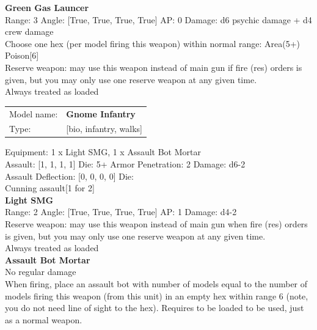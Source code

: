 {\bf Green Gas Launcer } \\



Range: 3  Angle: [True, True, True, True] AP: 0 Damage: d6 psychic damage + d4 crew damage \\
Choose one hex (per model firing this weapon) within normal range: Area(5+)\\ 
Poison[6]\\ 
Reserve weapon: may use this weapon instead of main gun if fire (res) orders is given, but you may only use one reserve weapon at any given time.\\ 
Always treated as loaded\\ 




 



\begin{tabular}{ll}
Model name: & {\bf Gnome Infantry } \\
Type: & [bio, infantry, walks] \\
\end{tabular}

Equipment: 1 x Light SMG, 1 x Assault Bot Mortar \\

Assault: [1, 1, 1, 1] Die: 5+ Armor Penetration: 2 Damage: d6-2 \\
Assault Deflection: [0, 0, 0, 0] Die: \\
\indent Cunning assault[1 for 2]\\ 
 



{\bf Light SMG } \\



Range: 2  Angle: [True, True, True, True] AP: 1 Damage: d4-2 \\
Reserve weapon: may use this weapon instead of main gun when fire (res) orders is given, but you may only use one reserve weapon at any given time.\\ 
Always treated as loaded\\ 




{\bf Assault Bot Mortar } \\

No regular damage\\ 
When firing, place an assault bot with number of models equal to the number of models firing this weapon (from this unit) in an empty hex within range 6 (note, you do not need line of sight to the hex). Requires to be loaded to be used, just as a normal weapon.\\ 





